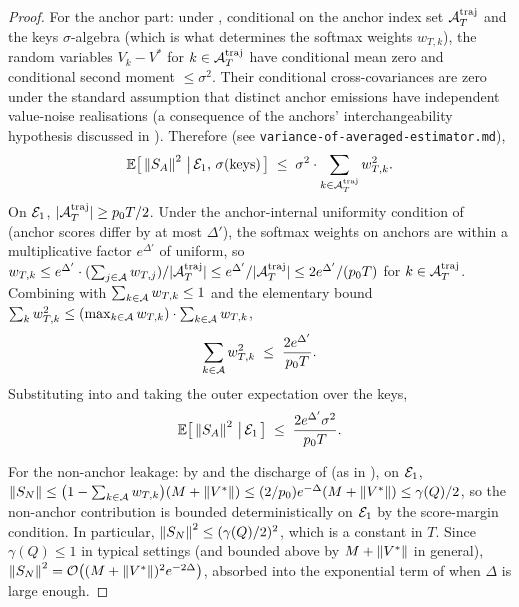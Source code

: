 \begin{proof}
For the anchor part: under , conditional on
the anchor index set $\mathcal{A}^{\mathrm{traj}}_T$ and the keys
$\sigma$-algebra (which is what determines the softmax weights $w_{T,k}$),
the random variables $V_k - V^*$ for $k \in \mathcal{A}^{\mathrm{traj}}_T$
have conditional mean zero and conditional second moment $\le \sigma^2$.
Their conditional cross-covariances are zero under the standard
assumption that distinct anchor emissions have independent value-noise
realisations (a consequence of the anchors' interchangeability hypothesis
discussed in ). Therefore
(see \texttt{variance-of-averaged-estimator.md}),
\begin{align}\label{eq:vr_anchor_var}
   \mathbb{E}\bigl[\,\left\| S_A \right\|^2 \,\big|\, \mathcal{E}_1,\, \sigma(\text{keys}) \,\bigr]
   \;\le\;
   \sigma^2 \cdot \sum_{k \in \mathcal{A}^{\mathrm{traj}}_T} w_{T,k}^2.
\end{align}
On $\mathcal{E}_1$, $|\mathcal{A}^{\mathrm{traj}}_T| \ge p_0 T / 2$. Under the
anchor-internal uniformity condition of
 (anchor scores differ by at most
$\Delta'$), the softmax weights on anchors are within a multiplicative
factor $e^{\Delta'}$ of uniform, so
$w_{T,k} \le e^{\Delta'} \cdot (\sum_{j \in \mathcal{A}} w_{T,j}) / |\mathcal{A}^{\mathrm{traj}}_T|
\le e^{\Delta'} / |\mathcal{A}^{\mathrm{traj}}_T| \le 2 e^{\Delta'} / (p_0 T)$
for $k \in \mathcal{A}^{\mathrm{traj}}_T$. Combining with
$\sum_{k \in \mathcal{A}} w_{T,k} \le 1$ and the elementary bound
$\sum_k w_{T,k}^2 \le (\max_{k \in \mathcal{A}} w_{T,k}) \cdot \sum_{k \in \mathcal{A}} w_{T,k}$,
\begin{align*}
   \sum_{k \in \mathcal{A}} w_{T,k}^2 \;\le\; \frac{2 e^{\Delta'}}{p_0 T}.
\end{align*}
Substituting into  and taking the outer
expectation over the keys,
\begin{align}\label{eq:vr_anchor_bound}
   \mathbb{E}\bigl[\,\left\| S_A \right\|^2 \,\big|\, \mathcal{E}_1\,\bigr]
   \;\le\;
   \frac{2 e^{\Delta'} \sigma^2}{p_0 T}.
\end{align}

For the non-anchor leakage: by  and the
discharge of  (as in
), on $\mathcal{E}_1$,
$\left\| S_N \right\| \le \bigl(1 - \sum_{k \in \mathcal{A}} w_{T,k}\bigr) (M + \left\| V^* \right\|)
\le (2/p_0) e^{-\Delta} (M + \left\| V^* \right\|) \le \gamma(Q)/2$, so the
non-anchor contribution is bounded deterministically on $\mathcal{E}_1$ by the
score-margin condition. In particular,
$\left\| S_N \right\|^2 \le (\gamma(Q)/2)^2$, which is a constant in $T$. Since
$\gamma(Q) \le 1$ in typical settings (and bounded above by
$M + \left\| V^* \right\|$ in general),
$\left\| S_N \right\|^2 = \mathcal{O}\bigl((M + \left\| V^* \right\|)^2 e^{-2\Delta}\bigr)$,
absorbed into the exponential term of 
when $\Delta$ is large enough.


\end{proof}
